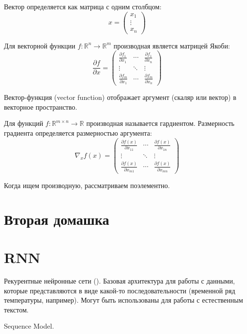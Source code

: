 Вектор определяется как матрица с одним столбцом:
\[
    x = 
    \begin{pmatrix}
        x_1 \\
            \vdots \\
        x_n
    \end{pmatrix}
\]

Для векторной функции $f: \mathbb{R}^n \to \mathbb{R}^m$ производная является
матрицей Якоби:
\[
    \frac{\partial f}{\partial x} =
    \begin{pmatrix}
        \frac{\partial f_1}{\partial x_1} & \cdots & \frac{\partial f_1}{\partial
        x_n} \\
            \vdots & \ddots & \vdots \\
\frac{\partial f_m}{\partial x_1} & \cdots & \frac{\partial f_m}{\partial
        x_n}
    \end{pmatrix}
\]

Вектор-функция (vector function) отображает аргумент (скаляр или вектор) в
векторное пространство.

Для функций $f: \mathbb{R}^{m \times n} \to \mathbb{R}$ производная называется
гардиентом. Размерность градиента определяется размерностью аргумента:
\[
    \nabla_x f(x) = 
    \begin{pmatrix}
        \frac{\partial f(x)}{\partial x_{11}} & \cdots & \frac{\partial f(x)}{\partial
        x_{1n}} \\
            \vdots & \ddots & \vdots \\
            \frac{\partial f(x)}{\partial x_{m1}} & \cdots & \frac{\partial
                f(x)}{\partial
            x_{mn}}
    \end{pmatrix}
\]

Когда ищем производную, рассматриваем поэлементно.


\section{Вторая домашка}

\section{RNN}

Рекурентные нейронные сети (). Базовая архитектура для работы с данными, которые
представляются в виде какой-то последовательности (временной ряд температуры,
например). Могут быть использованы для работы с естественным текстом.

Sequence Model.

